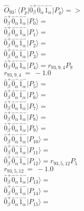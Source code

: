 \documentclass[14pt]{article}
\begin{document}
    $\hat{O}_{93}:  \langle{P_p}\vert \hat{0}_{\beta}^{+}\hat{0}_{\alpha}^{-}\hat{1}_{\alpha}^{-} \vert{P_q}\rangle => $ \\ 
    $ \hat{0}_{\beta}^{+}\hat{0}_{\alpha}^{-}\hat{1}_{\alpha}^{-} \vert{P_{0}}\rangle =  $ \\ 
    $ \hat{0}_{\beta}^{+}\hat{0}_{\alpha}^{-}\hat{1}_{\alpha}^{-} \vert{P_{1}}\rangle =  $ \\ 
    $ \hat{0}_{\beta}^{+}\hat{0}_{\alpha}^{-}\hat{1}_{\alpha}^{-} \vert{P_{2}}\rangle =  $ \\ 
    $ \hat{0}_{\beta}^{+}\hat{0}_{\alpha}^{-}\hat{1}_{\alpha}^{-} \vert{P_{3}}\rangle =  $ \\ 
    $ \hat{0}_{\beta}^{+}\hat{0}_{\alpha}^{-}\hat{1}_{\alpha}^{-} \vert{P_{4}}\rangle = {r}_{93,9,4}P_{9} $ \\ 
    ${r}_{93,9,4}\ =\ -1.0 $ \\ 
    $ \hat{0}_{\beta}^{+}\hat{0}_{\alpha}^{-}\hat{1}_{\alpha}^{-} \vert{P_{5}}\rangle =  $ \\ 
    $ \hat{0}_{\beta}^{+}\hat{0}_{\alpha}^{-}\hat{1}_{\alpha}^{-} \vert{P_{6}}\rangle =  $ \\ 
    $ \hat{0}_{\beta}^{+}\hat{0}_{\alpha}^{-}\hat{1}_{\alpha}^{-} \vert{P_{7}}\rangle =  $ \\ 
    $ \hat{0}_{\beta}^{+}\hat{0}_{\alpha}^{-}\hat{1}_{\alpha}^{-} \vert{P_{8}}\rangle =  $ \\ 
    $ \hat{0}_{\beta}^{+}\hat{0}_{\alpha}^{-}\hat{1}_{\alpha}^{-} \vert{P_{9}}\rangle =  $ \\ 
    $ \hat{0}_{\beta}^{+}\hat{0}_{\alpha}^{-}\hat{1}_{\alpha}^{-} \vert{P_{10}}\rangle =  $ \\ 
    $ \hat{0}_{\beta}^{+}\hat{0}_{\alpha}^{-}\hat{1}_{\alpha}^{-} \vert{P_{11}}\rangle =  $ \\ 
    $ \hat{0}_{\beta}^{+}\hat{0}_{\alpha}^{-}\hat{1}_{\alpha}^{-} \vert{P_{12}}\rangle = {r}_{93,5,12}P_{5} $ \\ 
    ${r}_{93,5,12}\ =\ -1.0 $ \\ 
    $ \hat{0}_{\beta}^{+}\hat{0}_{\alpha}^{-}\hat{1}_{\alpha}^{-} \vert{P_{13}}\rangle =  $ \\ 
    $ \hat{0}_{\beta}^{+}\hat{0}_{\alpha}^{-}\hat{1}_{\alpha}^{-} \vert{P_{14}}\rangle =  $ \\ 
    $ \hat{0}_{\beta}^{+}\hat{0}_{\alpha}^{-}\hat{1}_{\alpha}^{-} \vert{P_{15}}\rangle =  $ \\ 
    
\end{document}
